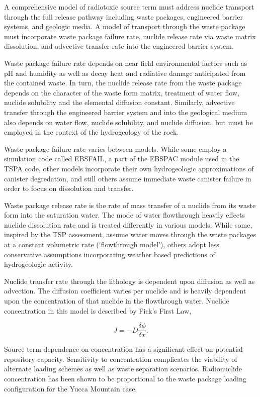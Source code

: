 A comprehensive model of radiotoxic source term must address nuclide transport
through the full release pathway including waste packages, engineered barrier
systems, and geologic media. A model of transport through the waste package
must incorporate waste package failure rate, nuclide release rate via waste
matrix dissolution, and advective transfer rate into the engineered barrier
system.  

Waste package failure rate depends on near field environmental factors such as
pH and humidity as well as decay heat and radiative damage anticipated from the
contained waste.  In turn, the nuclide release rate from the waste package
depends on the character of the waste form matrix, treatment of water flow,
nuclide solubility and the elemental diffusion constant.  Similarly, advective
transfer through the engineered barrier system and into the geological medium
also depends on water flow, nuclide solubility, and nuclide diffusion, but must
be employed in the context of the hydrogeology of the rock.   

Waste package failure rate varies between models. While some employ a
simulation code called EBSFAIL, a part of the EBSPAC module used in the TSPA
code, other models incorporate their own hydrogeologic approximations of
canister degredation, and still others assume immediate waste canister failure
in order to focus on dissolution and transfer. 

Waste package release rate is the rate of mass transfer of a nuclide from its
waste form into the saturation water. The mode of water flowthrough heavily
effects nuclide dissolution rate and is treated differently in various models.
While some, inspired by the TSP assessment, assume water moves through the
waste packages at a constant volumetric rate (`flowthrough model'), others
adopt less conservative assumptions incorporating weather based predictions of
hydrogeologic activity.

Nuclide transfer rate through the lithology is  dependent upon diffusion as
well as advection.  The diffusion coefficient varies per nuclide and is heavily
dependent upon the concentration of that nuclide in the flowthrough water.
Nuclide concentration in this model is described by Fick's First Law, 

\begin{equation} J = -D\frac{\delta\phi}{\delta x}.  \end{equation}

Source term dependence on concentration has a significant effect on potential
repository capacity. Sensitivity to concentration complicates the viability of
alternate loading schemes as well as waste separation scenarios. Radionuclide
concentration has been shown to be proportional to the waste package loading
configuration for the Yucca Mountain
case.\cite{ahn_relationship_2002,kawasaki_congruent_2004}


